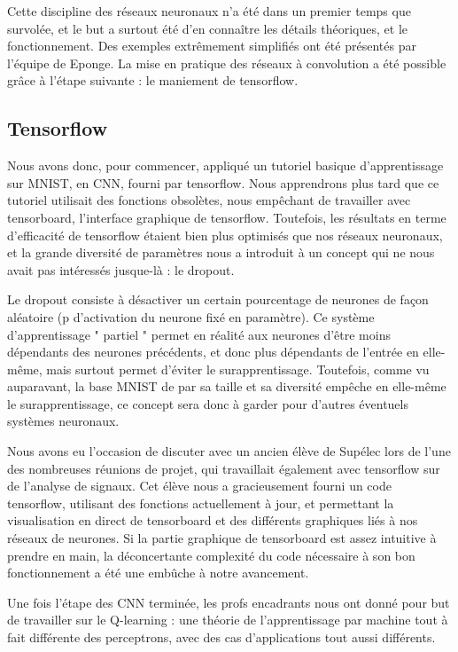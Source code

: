 \documentclass[
    10pt,
    a4paper,
    oneside,
    headinclude,footinclude,
    BCOR=5mm,
]{scrartcl}
\begin{document}
Cette discipline des réseaux neuronaux n'a été dans un premier temps que survolée, et le but a surtout été d'en connaître les détails théoriques, et le
fonctionnement. Des exemples extrêmement simplifiés ont été présentés par l'équipe de Eponge. La mise en pratique des réseaux à convolution a été possible
grâce à l'étape suivante : le maniement de tensorflow. 

\subsection{Tensorflow}

Nous avons donc, pour commencer, appliqué un tutoriel basique d'apprentissage sur MNIST, en CNN, fourni par tensorflow. Nous apprendrons plus tard que ce
tutoriel utilisait des fonctions obsolètes, nous empêchant de travailler avec tensorboard, l'interface graphique de tensorflow. Toutefois, les résultats en
terme d'efficacité de tensorflow étaient bien plus optimisés que nos réseaux neuronaux, et la grande diversité de paramètres nous a introduit à
un concept qui ne nous avait pas intéressés jusque-là : le dropout.

Le dropout consiste à désactiver un certain pourcentage de neurones de façon aléatoire (p d'activation du neurone fixé en paramètre). Ce système
d'apprentissage " partiel " permet en réalité aux neurones d'être moins dépendants des neurones précédents, et donc plus dépendants de l'entrée en
elle-même, mais surtout permet d'éviter le surapprentissage. Toutefois, comme vu auparavant, la base MNIST de par sa taille et sa diversité empêche en
elle-même le surapprentissage, ce concept sera donc à garder pour d'autres éventuels systèmes neuronaux.

Nous avons eu l'occasion de discuter avec un ancien élève de Supélec lors de l'une des nombreuses réunions de projet, qui travaillait également avec
tensorflow sur de l'analyse de signaux. Cet élève nous a gracieusement fourni un code tensorflow, utilisant des fonctions actuellement à jour, et
permettant la visualisation en direct de tensorboard et des différents graphiques liés à nos réseaux de neurones. Si la partie graphique de tensorboard est
assez intuitive à prendre en main, la déconcertante complexité du code nécessaire à son bon fonctionnement a été une embûche à notre avancement.

Une fois l'étape des CNN terminée, les profs encadrants nous ont donné pour but de travailler sur le Q-learning : une théorie de l'apprentissage par
machine tout à fait différente des perceptrons, avec des cas d'applications tout aussi différents.
\end{document}
